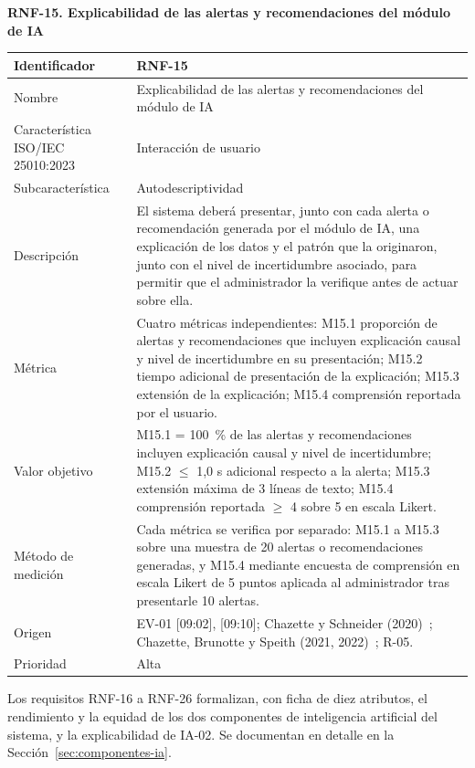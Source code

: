\documentclass[12pt,a4paper]{article}
\begin{document}
\begin{minipage}{\linewidth}
\bigskip
\noindent\textbf{RNF-15. Explicabilidad de las alertas y recomendaciones del módulo de IA}
\label{tab:RNF-15}

\begin{center}
\begin{tabular}{|p{4.2cm}|p{10cm}|}
\hline
Identificador & RNF-15 \\
\hline
Nombre & Explicabilidad de las alertas y recomendaciones del módulo de IA \\
\hline
Característica ISO/IEC 25010:2023 & Interacción de usuario \\
\hline
Subcaracterística & Autodescriptividad \\
\hline
Descripción & El sistema deberá presentar, junto con cada alerta o recomendación generada por el módulo de IA, una explicación de los datos y el patrón que la originaron, junto con el nivel de incertidumbre asociado, para permitir que el administrador la verifique antes de actuar sobre ella. \\
\hline
Métrica & Cuatro métricas independientes: M15.1 proporción de alertas y recomendaciones que incluyen explicación causal y nivel de incertidumbre en su presentación; M15.2 tiempo adicional de presentación de la explicación; M15.3 extensión de la explicación; M15.4 comprensión reportada por el usuario. \\
\hline
Valor objetivo & M15.1 = 100~\% de las alertas y recomendaciones incluyen explicación causal y nivel de incertidumbre; M15.2 $\leq$ 1,0 s adicional respecto a la alerta; M15.3 extensión máxima de 3 líneas de texto; M15.4 comprensión reportada $\geq$ 4 sobre 5 en escala Likert. \\
\hline
Método de medición & Cada métrica se verifica por separado: M15.1 a M15.3 sobre una muestra de 20 alertas o recomendaciones generadas, y M15.4 mediante encuesta de comprensión en escala Likert de 5 puntos aplicada al administrador tras presentarle 10 alertas. \\
\hline
Origen & EV-01 [09:02], [09:10]; Chazette y Schneider (2020)~\cite{chazette2020}; Chazette, Brunotte y Speith (2021, 2022)~\cite{chazette2021,chazette2022}; R-05. \\
\hline
Prioridad & Alta \\
\hline
\end{tabular}
\end{center}
\end{minipage}

Los requisitos RNF-16 a RNF-26 formalizan, con ficha de diez atributos, el rendimiento y la equidad de los dos componentes de inteligencia artificial del sistema, y la explicabilidad de IA-02. Se documentan en detalle en la Sección~\ref{sec:componentes-ia}.
\end{document}
